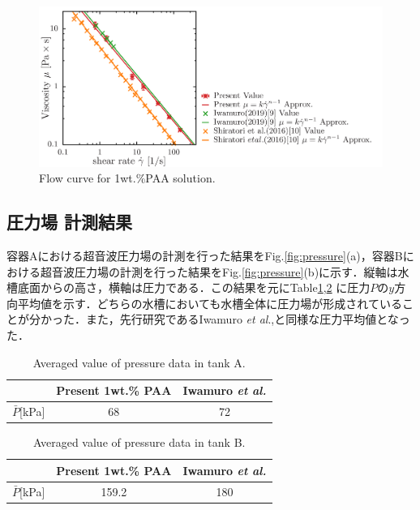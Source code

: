 \begin{figure}[ht]
    \centering
    \includegraphics[width=12cm,clip]{4-Results/PAA-viscosity.png}
    \caption{Flow curve for 1wt.\%PAA solution.}
    \label{fig:PAA-vis}
\end{figure}

\newpage

\subsection{圧力場 計測結果}

容器Aにおける超音波圧力場の計測を行った結果をFig.\ref{fig:pressure}(a)，容器Bにおける超音波圧力場の計測を行った結果をFig.\ref{fig:pressure}(b)に示す．縦軸は水槽底面からの高さ，横軸は圧力である．この結果を元にTable\ref{table:press-A},\ref{table:press-B} に圧力$P$の$y$方向平均値を示す．どちらの水槽においても水槽全体に圧力場が形成されていることが分かった．また，先行研究であるIwamuro \textit{et al}.\cite{ref:8},\cite{ref:9}と同様な圧力平均値となった．

\begin{table}[h]
    \centering
    \caption{Averaged value of pressure data in tank A.}
    \label{table:press-A}
    \begin{tabular}{c|c|c}\hline
                       & Present 1wt.\% PAA & Iwamuro {\it et al.}\cite{ref:8} \\ \hline
        $\bar{P}$[kPa] &       68        & 72                              \\ \hline
    \end{tabular}
\end{table}

\begin{table}[h]
    \centering
    \caption{Averaged value of pressure data in tank B.}
    \label{table:press-B}
    \begin{tabular}{c|c|c}\hline
                       & Present 1wt.\% PAA & Iwamuro {\it et al.}\cite{ref:9} \\ \hline
        $\bar{P}$[kPa] & 159.2              & 180                              \\ \hline
    \end{tabular}
\end{table}

